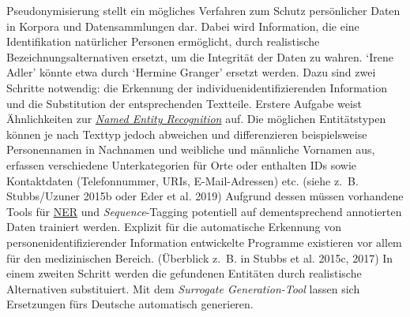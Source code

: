 \documentclass{article}
\begin{document}
    Pseudonymisierung stellt ein mögliches Verfahren zum Schutz persönlicher Daten in
                  Korpora und Datensammlungen dar. Dabei wird Information, die eine Identifikation
                  natürlicher Personen ermöglicht, durch realistische Bezeichnungsalternativen
                  ersetzt, um die Integrität der Daten zu wahren. ‘Irene Adler’ könnte etwa durch
                  ‘Hermine Granger’ ersetzt werden. Dazu sind zwei Schritte notwendig: die Erkennung
                  der individuenidentifizierenden Information und die Substitution der
                  entsprechenden Textteile. Erstere Aufgabe weist Ähnlichkeiten zur \emph{\href{http://gams.uni-graz.at/o:konde.141}{Named Entity Recognition}} auf. Die möglichen Entitätstypen können je nach Texttyp jedoch abweichen und
                  differenzieren beispielsweise Personennamen in Nachnamen und weibliche und
                  männliche Vornamen aus, erfassen verschiedene Unterkategorien für Orte oder
                  enthalten IDs sowie Kontaktdaten (Telefonnummer, URIs, E-Mail-Adressen) etc.
                  (siehe z. B. Stubbs/Uzuner 2015b oder Eder et al. 2019) Aufgrund dessen müssen
                  vorhandene Tools für \href{http://gams.uni-graz.at/o:konde.141}{NER} und \emph{Sequence}-Tagging potentiell auf dementsprechend annotierten
                  Daten trainiert werden. Explizit für die automatische Erkennung von
                  personenidentifizierender Information entwickelte Programme existieren vor allem
                  für den medizinischen Bereich. (Überblick z. B. in Stubbs et al. 2015c, 2017) In einem zweiten
                  Schritt werden die gefundenen Entitäten durch realistische Alternativen
                  substituiert. Mit dem \emph{Surrogate Generation-Tool} lassen sich
                  Ersetzungen fürs Deutsche automatisch generieren.\\
            
\end{document}
